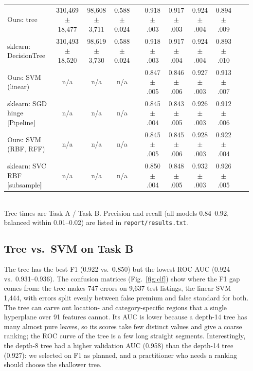 \documentclass[10pt,twocolumn,a4paper]{article}
\begin{document}
\begin{table}[t]
{\begin{tabular}{@{}l ccc c cccc cc@{}}
    Ours: tree                          & 310{,}469 $\pm$ 18{,}477 & 98{,}608 $\pm$ 3{,}711 & 0.588 $\pm$ 0.024 && 0.918 $\pm$ .003 & 0.917 $\pm$ .003 & 0.924 $\pm$ .004 & 0.894 $\pm$ .009 & & \\
    sklearn: DecisionTree               & 310{,}493 $\pm$ 18{,}520 & 98{,}619 $\pm$ 3{,}730 & 0.588 $\pm$ 0.024 && 0.918 $\pm$ .003 & 0.917 $\pm$ .004 & 0.924 $\pm$ .004 & 0.893 $\pm$ .010 & & \\
    Ours: SVM (linear)                  & n/a & n/a & n/a && 0.847 $\pm$ .005 & 0.846 $\pm$ .006 & 0.927 $\pm$ .003 & 0.913 $\pm$ .007 & & \\
    sklearn: SGD hinge [Pipeline]       & n/a & n/a & n/a && 0.845 $\pm$ .004 & 0.843 $\pm$ .005 & 0.926 $\pm$ .003 & 0.912 $\pm$ .006 & & \\
    Ours: SVM (RBF, RFF)                & n/a & n/a & n/a && 0.845 $\pm$ .005 & 0.845 $\pm$ .006 & 0.928 $\pm$ .003 & 0.922 $\pm$ .004 & & \\
    sklearn: SVC RBF [subsample]        & n/a & n/a & n/a && 0.850 $\pm$ .004 & 0.848 $\pm$ .005 & 0.932 $\pm$ .003 & 0.926 $\pm$ .005 & & \\
    \bottomrule
  \end{tabular}}
  \\[3pt]
  \footnotesize Tree times are Task A / Task B. Precision and recall (all models
  0.84--0.92, balanced within 0.01--0.02) are listed in \texttt{report/results.txt}.
\end{table}

\subsection{Tree vs.\ SVM on Task B}
The tree has the best F1 (0.922 vs.\ 0.850) but the lowest ROC-AUC (0.924
vs.\ 0.931--0.936). The confusion matrices (Fig.~\ref{fig:clf}) show where
the F1 gap comes from: the tree makes 747 errors on 9{,}637 test listings,
the linear SVM 1{,}444, with errors split evenly between false premium and
false standard for both. The tree can carve out location- and
category-specific regions that a single hyperplane over 91 features cannot.
Its AUC is lower because a depth-14 tree has many almost pure leaves, so
its scores take few distinct values and give a coarse ranking; the ROC curve
of the tree is a few long straight segments. Interestingly, the depth-8
tree had a higher validation AUC (0.958) than the depth-14 tree (0.927):
we selected on F1 as planned, and a practitioner who needs a ranking
should choose the shallower tree.
\end{document}
